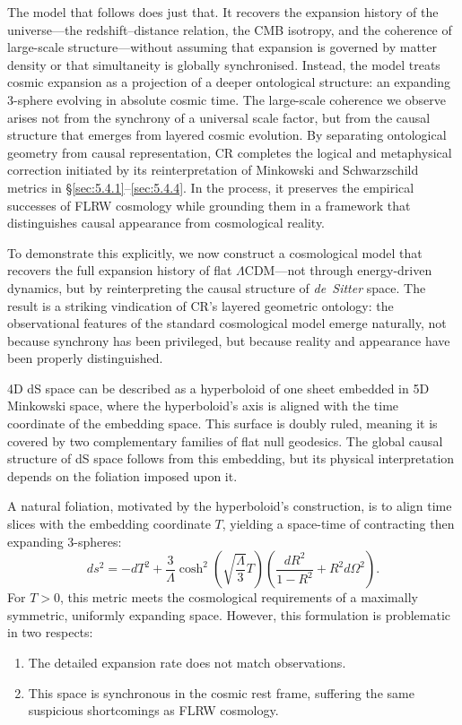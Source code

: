 \documentclass[12pt]{book}
\begin{document}
The model that follows does just that. It recovers the expansion history of the universe---the redshift–distance relation, the CMB isotropy, and the coherence of large-scale structure---without assuming that expansion is governed by matter density or that simultaneity is globally synchronised. Instead, the model treats cosmic expansion as a projection of a deeper ontological structure: an expanding 3-sphere evolving in absolute cosmic time. The large-scale coherence we observe arises not from the synchrony of a universal scale factor, but from the causal structure that emerges from layered cosmic evolution. By separating ontological geometry from causal representation, CR completes the logical and metaphysical correction initiated by its reinterpretation of Minkowski and Schwarzschild metrics in \S\ref{sec:5.4.1}–\ref{sec:5.4.4}. In the process, it preserves the empirical successes of FLRW cosmology while grounding them in a framework that distinguishes causal appearance from cosmological reality.

To demonstrate this explicitly, we now construct a cosmological model that recovers the full expansion history of flat $\Lambda$CDM---not through energy-driven dynamics, but by reinterpreting the causal structure of \textit{de~Sitter} space. The result is a striking vindication of CR's layered geometric ontology: the observational features of the standard cosmological model emerge naturally, not because synchrony has been privileged, but because reality and appearance have been properly distinguished.

4D dS space can be described as a hyperboloid of one sheet embedded in 5D Minkowski space, where the hyperboloid's axis is aligned with the time coordinate of the embedding space. This surface is doubly ruled, meaning it is covered by two complementary families of flat null geodesics. The global causal structure of dS space follows from this embedding, but its physical interpretation depends on the foliation imposed upon it.

A natural foliation, motivated by the hyperboloid's construction, is to align time slices with the embedding coordinate $T$, yielding a space-time of contracting then expanding 3-spheres:
\begin{equation}
    ds^2=-dT^2+\frac{3}{\Lambda}\cosh^2\left(\sqrt{\frac{\Lambda}{3}}T\right)\left(\frac{dR^2}{1-R^2}+R^2d\Omega^2\right).\label{eq:dS_hyp}
\end{equation}
For $T>0$, this metric meets the cosmological requirements of a maximally symmetric, uniformly expanding space. However, this formulation is problematic in two respects:
\begin{enumerate}
    \item The detailed expansion rate does not match observations.
    \item This space is synchronous in the cosmic rest frame, suffering the same suspicious shortcomings as FLRW cosmology.
\end{enumerate}
\end{document}

